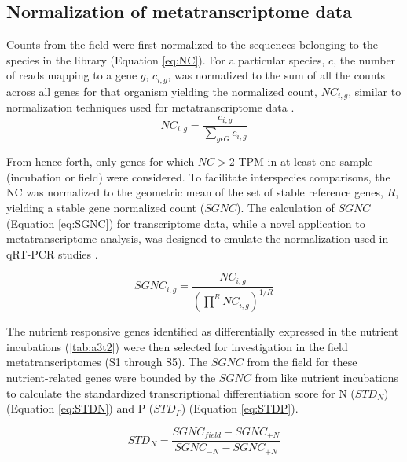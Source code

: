 \subsection{Normalization of metatranscriptome data}
Counts from the field were first normalized to the sequences belonging to the species in the library (Equation \ref{eq:NC}). For a particular species, $c$, the number of reads mapping to a gene $g$, $c_{i,g}$, was normalized to the sum of all the counts across all genes for that organism yielding the normalized count, $NC_{i,g}$, similar to normalization techniques used for metatranscriptome data \citep{Marchetti2012a, Ottesen2011}. 
\begin{equation}
	\label{eq:NC}
	NC_{i,g} = \frac{c_{i,g}}{\sum \limits_{g \epsilon G} c_{i,g}}
\end{equation}

From hence forth, only genes for which $NC > 2$ TPM in at least one sample (incubation or field) were considered. To facilitate interspecies comparisons, the NC was normalized to the geometric mean of the set of stable reference genes, $R$, yielding a stable gene normalized count ($SGNC$). The calculation of $SGNC$ (Equation \ref{eq:SGNC}) for transcriptome data, while a novel application to metatranscriptome analysis, was designed to emulate the normalization used in qRT-PCR studies \citep{Vandesompele2002}. \par
\begin{equation}
	\label{eq:SGNC}
 	SGNC_{i,g}=\frac{NC_{i,g}}{\left ( \prod \limits^{R} NC_{i,g} \right ) ^{1/R}}
\end{equation}

The nutrient responsive genes identified as differentially expressed in the nutrient incubations (\cref{tab:a3t2}) were then selected for investigation in the field metatranscriptomes (S1 through S5). The $SGNC$ from the field for these nutrient-related genes were bounded by the $SGNC$ from like nutrient incubations to calculate the standardized transcriptional differentiation score for N ($STD_N$) (Equation \ref{eq:STDN}) and P ($STD_P$) (Equation \ref{eq:STDP}).\par 

\begin{equation}
	\label{eq:STDN}
	STD_N = \frac{SGNC_{field} - SGNC_{+N}}{SGNC_{-N} - SGNC_{+N}} 	
\end{equation}

